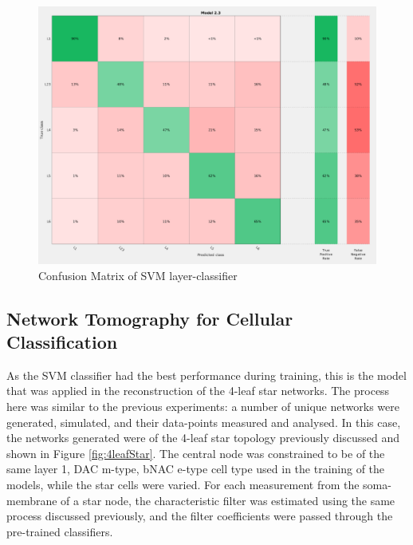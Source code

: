 \begin{figure}[ht]
    \centering
    \includegraphics[width=1.0\textwidth]{05-Results/svmLayerConf.png}
    \caption{Confusion Matrix of SVM layer-classifier}
    \label{fig:svmConfMatLayer}
\end{figure}



\subsection{Network Tomography for Cellular Classification}

As the SVM classifier had the best performance during training, this is the model that was applied in the reconstruction of the 4-leaf star networks. The process here was similar to the previous experiments: a number of unique networks were generated, simulated, and their data-points measured and analysed. In this case, the networks generated were of the 4-leaf star topology previously discussed and shown in Figure \ref{fig:4leafStar}. The central node was constrained to be of the same layer 1, DAC m-type, bNAC e-type cell type used in the training of the models, while the star cells were varied. For each measurement from the soma-membrane of a star node, the characteristic filter was estimated using the same process discussed previously, and the filter coefficients were passed through the pre-trained classifiers.

